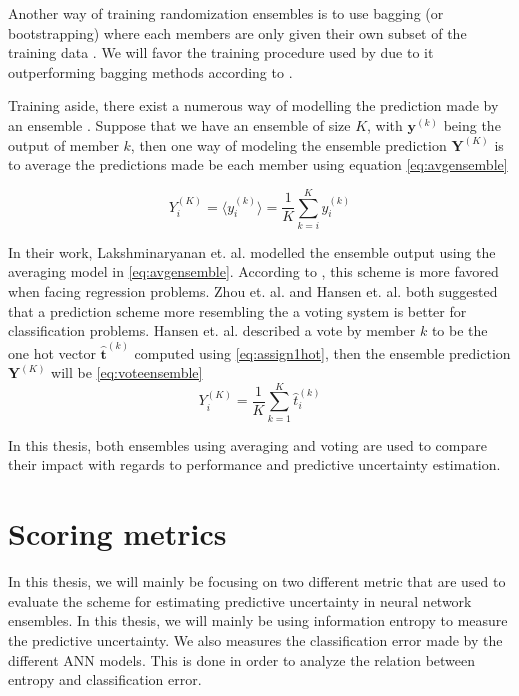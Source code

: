 Another way of training randomization ensembles is to use bagging (or bootstrapping) where each members are only given their own subset of the training data \cite{breiman2001random}. We will favor the training procedure used by \cite{lakshminarayanan2017simple} due to it outperforming bagging methods according to \cite{lee2015m,lakshminarayanan2017simple}.

Training aside, there exist a numerous way of modelling the prediction made by an ensemble \cite{lee2015m,li2018research,zhou2002ensembling}. Suppose that we have an ensemble of size $K$, with $\bm{y}^{(k)}$ being the output of member $k$, then one way of modeling the ensemble prediction $\bm{Y}^{(K)}$ is to average the predictions made be each member using equation \eqref{eq:avgensemble}

\begin{equation}
    \label{eq:avgensemble}
    Y^{(K)}_i = \langle y^{(k)}_i \rangle = \frac{1}{K}\sum_{k=i}^K y^{(k)}_i
\end{equation}

In their work, Lakshminaryanan et. al. \cite{lakshminarayanan2017simple} modelled the ensemble output using the averaging model in \eqref{eq:avgensemble}.
According to \cite{zhou2002ensembling}, this scheme is more favored when facing regression problems. Zhou et. al. \cite{zhou2002ensembling} and Hansen et. al. \cite{hansen1990neural} both suggested that a prediction scheme more resembling the a voting system is better for classification problems. Hansen et. al. \cite{hansen1990neural} described a vote by member $k$ to be the one hot vector $\hat{\bm{t}}^{(k)}$ computed using \eqref{eq:assign1hot}, then the ensemble prediction $\bm{Y}^{(K)}$ will be \eqref{eq:voteensemble}
\begin{equation}
    \label{eq:voteensemble}
    Y^{(K)}_i = \frac{1}{K}\sum_{k=1}^{K} \hat{t}^{(k)}_i
\end{equation}

In this thesis, both ensembles using averaging and voting are used to compare their impact with regards to performance and predictive uncertainty estimation.

\section{Scoring metrics}
\label{sect:scoring}
In this thesis, we will mainly be focusing on two different metric that are used to evaluate the scheme for estimating predictive uncertainty in neural network ensembles. In this thesis, we will mainly be using information entropy to measure the predictive uncertainty. We also measures the classification error made by the different ANN models. This is done in order to analyze the relation between entropy and classification error.

